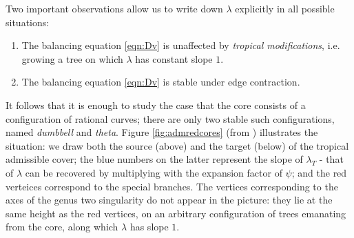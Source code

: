 \documentclass{compositio}
\theoremstyle{plain}
\theoremstyle{definition}
\theoremstyle{remark}
\begin{document}
 Two important observations allow us to write down $\lambda$ explicitly in all possible situations:
 \begin{enumerate}
  \item The balancing equation \eqref{eqn:Dv} is unaffected by \emph{tropical modifications}, i.e. growing a tree on which $\lambda$ has constant slope $1$.
  \item The balancing equation \eqref{eqn:Dv} is stable under edge contraction.
 \end{enumerate}
 It follows that it is enough to study the case that the core consists of a configuration of rational curves; there are only two stable such configurations, named \emph{dumbbell} and \emph{theta}. Figure \ref{fig:admredcores} (from \cite{BC}) illustrates the situation: we draw both the source (above) and the target (below) of the tropical admissible cover; the blue numbers on the latter represent the slope of $\lambda_T$ - that of $\lambda$ can be recovered by multiplying with the expansion factor of $\psi$; and the red verteices correspond to the special branches. The vertices corresponding to the axes of the genus two singularity do not appear in the picture: they lie at the same height as the red vertices, on an arbitrary configuration of trees emanating from the core, along which $\lambda$ has slope $1$.
\end{document}
